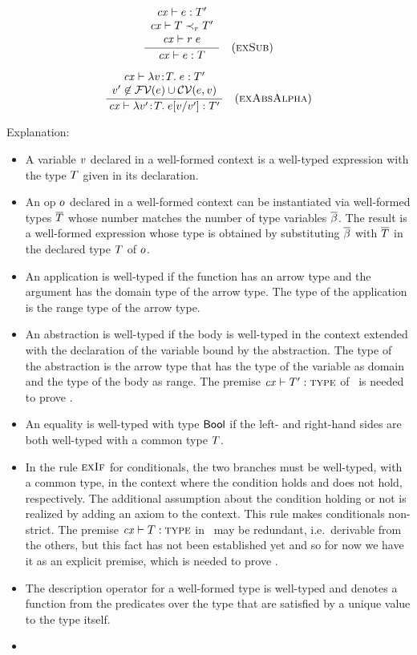 \[
\frac{\begin{array}{c}\mathit{cx}\vdash e:T'\\\mathit{cx}\vdash T\prec_{r}T'\\\mathit{cx}\vdash r\;e\end{array}}{\mathit{cx}\vdash e:T}\quad\mbox{(\textsc{exSub})}
\]

\[
\frac{\begin{array}{c}\mathit{cx}\vdash\lambda v\!:\!T.\;e:T'\\v'\not\in\mathcal{FV}(e)\cup\mathcal{CV}(e,v)\end{array}}{\mathit{cx}\vdash\lambda v'\!:\!T.\;e[v/v']:T'}\quad\mbox{(\textsc{exAbsAlpha})}
\]

Explanation:
\begin{itemize}
\item
A variable $v$ declared in a well-formed context is a well-typed expression
with the type $T$ given in its declaration.
\item
An op $o$ declared in a well-formed context can be instantiated via
well-formed types $\overline{T}$ whose number matches the number of type variables
$\overline{\beta}$. The result is a well-formed expression whose type is obtained by
substituting $\overline{\beta}$ with $\overline{T}$ in the declared type $T$ of $o$.
\item
An application is well-typed if the function has an arrow type and the
argument has the domain type of the arrow type. The type of the application is
the range type of the arrow type.
\item
An abstraction is well-typed if the body is well-typed in the context extended
with the declaration of the variable bound by the abstraction. The type of the
abstraction is the arrow type that has the type of the variable as domain and
the type of the body as range. The premise $\mathit{cx}\vdash T':\textsc{type}$ of \Reabs\ is
needed to prove .
\item
An equality is well-typed with type $\mathsf{Bool}$ if the left- and right-hand sides
are both well-typed with a common type $T$.
\item
In the rule $\textsc{exIf}$ for conditionals, the two branches must be well-typed,
with a common type, in the context where the condition holds and does not
hold, respectively. The additional assumption about the condition holding or
not is realized by adding an axiom to the context. This rule makes
conditionals non-strict. The premise $\mathit{cx}\vdash T:\textsc{type}$ in \Reif\ may be
redundant, i.e.\ derivable from the others, but this fact has not been
established yet and so for now we have it as an explicit premise, which is
needed to prove .
\item
The description operator for a well-formed type is well-typed and denotes a
function from the predicates over the type that are satisfied by a unique
value to the type itself.
\item

\end{itemize}
